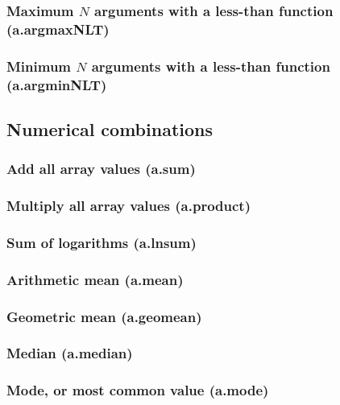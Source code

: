 \documentclass{article}
\theoremstyle{definition}
\begin{document}
\subsubsection{Maximum $N$ arguments with a less-than function (a.argmaxNLT)}

\subsubsection{Minimum $N$ arguments with a less-than function (a.argminNLT)}

\subsection{Numerical combinations}

\subsubsection{Add all array values (a.sum)}

\subsubsection{Multiply all array values (a.product)}

\subsubsection{Sum of logarithms (a.lnsum)}

\subsubsection{Arithmetic mean (a.mean)}

\subsubsection{Geometric mean (a.geomean)}

\subsubsection{Median (a.median)}

\subsubsection{Mode, or most common value (a.mode)}
\end{document}
